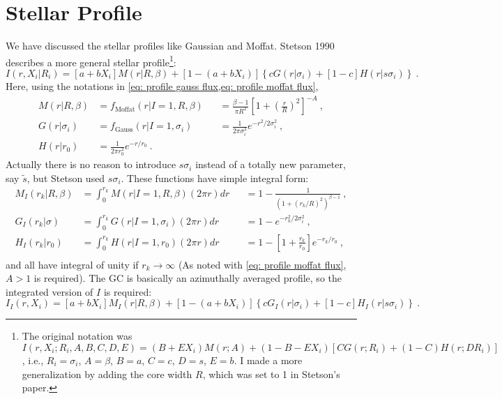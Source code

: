\section{Stellar Profile}
We have discussed the stellar profiles like Gaussian and Moffat. Stetson 1990 describes a more general stellar profile\footnote{The original notation was $ I(r, X_i; R_i, A, B, C, D, E) = (B + E X_i) M(r; A) + (1 - B - EX_i) [ C G(r; R_i) + (1 - C) H(r; DR_i) ] $, i.e., $ R_i = \sigma_i $, $ A = \beta $, $ B = a $, $ C = c $, $ D = s $, $ E = b $. I made a more generalization by adding the core width $ R $, which was set to 1 in Stetson's paper.}:
\begin{equation*}
  I(r, X_i | R_i) 
    = [a + b X_i] M(r | R, \beta) 
      + [1 - (a + b X_i)] \left \{ c G(r | \sigma_i) + [1 - c] H(r | s\sigma_i) \right \} ~.
\end{equation*}
Here, using the notations in \cref{eq: profile gauss flux,eq: profile moffat flux}, 
\begin{equation*}
\begin{aligned}
  M(r | R, \beta) 
    &= f_\mathrm{Moffat}(r | I = 1, R, \beta) 
    &&= \frac{\beta - 1}{\pi R^2} \left [ 1 + \left (\frac{r}{R} \right )^2 \right ]^{-A} ~, \\
  G(r | \sigma_i) 
    &= f_\mathrm{Gauss}(r | I = 1, \sigma_i)
    &&= \frac{1}{2\pi \sigma_i^2} e^{-r^2/2\sigma_i^2} ~, \\
  H(r | r_0) 
    &= \frac{1}{2\pi r_0^2} e^{-r/r_0} ~. &&
\end{aligned}
\end{equation*}
Actually there is no reason to introduce $ s \sigma_i $ instead of a totally new parameter, say $ \tilde{s} $, but Stetson used $ s\sigma_i $. These functions have simple integral form:
\begin{equation}\label{eq: growth_curve_integral}
\begin{aligned}
  M_I(r_k | R, \beta) 
    &= \int_{0}^{r_k} M(r | I = 1, R, \beta) (2 \pi r) dr
    &&= 1 - \frac{1}{ \left (1 + (r_k/R)^2 \right )^{\beta - 1}} ~, \\
  G_I(r_k | \sigma) 
    &= \int_{0}^{r_k} G(r| I = 1, \sigma_i) (2 \pi r) dr
    &&= 1 - e^{-r_k^2/2\sigma_i^2} ~, \\
  H_I(r_k | r_0) 
    &= \int_{0}^{r_k} H(r | I = 1, r_0) (2 \pi r) dr
    &&= 1 - \left [ 1 + \frac{r_k}{r_0} \right ] e^{-r_k/r_0} ~, \\  
\end{aligned}
\end{equation}
and all have integral of unity if $ r_k \rightarrow \infty $ (As noted with \cref{eq: profile moffat flux}, $ A > 1 $ is required). The GC is basically an azimuthally averaged profile, so the integrated version of $ I $ is required:
\begin{equation}\label{eq: daogrowth_profile}
  I_I(r, X_i) 
    = [a + b X_i] M_I(r | R, \beta) 
      + [1 - (a + bX_i)] \left \{ c G_I(r | \sigma_i) + [1 - c] H_I(r | s\sigma_i) \right \} ~.
\end{equation}












